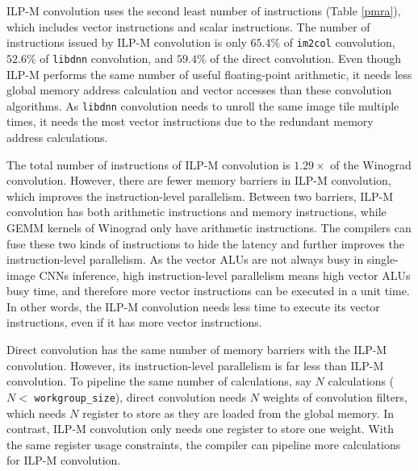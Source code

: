 \documentclass{article}
\begin{document}
ILP-M convolution uses the second least number of instructions (Table \ref{pmra}), which includes vector instructions and scalar instructions. The number of instructions issued by ILP-M convolution is only $65.4\%$ of \texttt{im2col} convolution, $52.6\%$ of \texttt{libdnn} convolution, and $59.4\%$ of the direct convolution. Even though ILP-M performs the same number of useful floating-point arithmetic, it needs less global memory address calculation and vector accesses than these convolution algorithms. As \texttt{libdnn} convolution needs to unroll the same image tile multiple times, it needs the most vector instructions due to the redundant memory address calculations.

The total number of instructions of ILP-M convolution is $1.29 \times$ of the Winograd convolution. However, there are fewer memory barriers in ILP-M convolution, which improves the instruction-level parallelism. Between two barriers, ILP-M convolution has both arithmetic instructions and memory instructions, while GEMM kernels of Winograd only have arithmetic instructions. The compilers can fuse these two kinds of instructions to hide the latency and further improves the instruction-level parallelism. As the vector ALUs are not always busy in single-image CNNs inference, high instruction-level parallelism means high vector ALUs busy time, and therefore more vector instructions can be executed in a unit time. In other words, the ILP-M convolution needs less time to execute its vector instructions, even if it has more vector instructions.

Direct convolution has the same number of memory barriers with the ILP-M convolution. However, its instruction-level parallelism is far less than ILP-M convolution. To pipeline the same number of calculations, say $N$ calculations ($N < $ \texttt{workgroup\_size}), direct convolution needs $N$ weights of convolution filters, which needs $N$ register to store as they are loaded from the global memory. In contrast, ILP-M convolution only needs one register to store one weight. With the same register usage constraints, the compiler can pipeline more calculations for ILP-M convolution.


\end{document}
